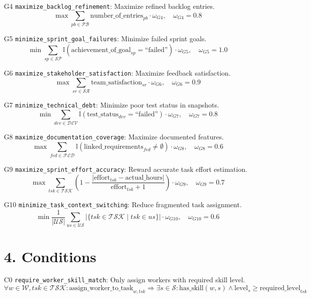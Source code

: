 \documentclass[12pt]{article}
\begin{document}
    \item[G4] \texttt{maximize\_backlog\_refinement}: Maximize refined backlog entries.
    \[
    \max \sum_{pb \in \mathcal{PB}} \text{number\_of\_entries}_{pb} \cdot \omega_{G4}, \quad \omega_{G4} = 0.8
    \]

    \item[G5] \texttt{minimize\_sprint\_goal\_failures}: Minimize failed sprint goals.
    \[
    \min \sum_{sp \in \mathcal{SP}} \mathbb{I}(\text{achievement\_of\_goal}_{sp} = \text{``failed''}) \cdot \omega_{G5}, \quad \omega_{G5} = 1.0
    \]

    \item[G6] \texttt{maximize\_stakeholder\_satisfaction}: Maximize feedback satisfaction.
    \[
    \max \sum_{sr \in \mathcal{SR}} \text{team\_satisfaction}_{sr} \cdot \omega_{G6}, \quad \omega_{G6} = 0.9
    \]

    \item[G7] \texttt{minimize\_technical\_debt}: Minimize poor test status in snapshots.
    \[
    \min \sum_{dev \in \mathcal{DEV}} \mathbb{I}(\text{test\_status}_{dev} = \text{``failed''}) \cdot \omega_{G7}, \quad \omega_{G7} = 0.8
    \]

    \item[G8] \texttt{maximize\_documentation\_coverage}: Maximize documented features.
    \[
    \max \sum_{fed \in \mathcal{FED}} \mathbb{I}(\text{linked\_requirements}_{fed} \neq \emptyset) \cdot \omega_{G8}, \quad \omega_{G8} = 0.6
    \]

    \item[G9] \texttt{maximize\_sprint\_effort\_accuracy}: Reward accurate task effort estimation.
    \[
    \max \sum_{tsk \in \mathcal{TSK}} \left(1 - \frac{| \text{effort}_{tsk} - \text{actual\_hours} |}{\text{effort}_{tsk} + 1}\right) \cdot \omega_{G9}, \quad \omega_{G9} = 0.7
    \]

    \item[G10] \texttt{minimize\_task\_context\_switching}: Reduce fragmented task assignment.
    \[
    \min \frac{1}{|\mathcal{US}|} \sum_{us \in \mathcal{US}} |\{ tsk \in \mathcal{TSK} \mid tsk \in us \}| \cdot \omega_{G10}, \quad \omega_{G10} = 0.6
    \]

\section{4. Conditions}
\item[C0] \texttt{require\_worker\_skill\_match}: Only assign workers with required skill level.
    \[
    \forall w \in \mathcal{W}, tsk \in \mathcal{TSK}: \text{assign\_worker\_to\_task}_{w,tsk} \Rightarrow \exists s \in \mathcal{S}: \text{has\_skill}(w,s) \land \text{level}_s \geq \text{required\_level}_{tsk}
    \]
\end{document}
